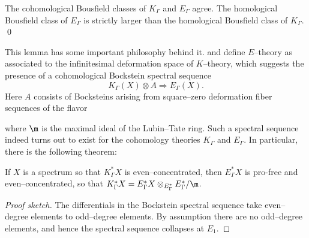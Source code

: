 \begin{lemma}\label{BadBousfieldClasses}
The cohomological Bousfield classes of $K_\Gamma$ and $E_\Gamma$ agree.  The homological Bousfield class of $E_\Gamma$ is strictly larger than the homological Bousfield class of $K_\Gamma$. \qed
\end{lemma}

\noindent This lemma has some important philosophy behind it.   and  define $E$--theory as associated to the infinitesimal deformation space of $K$--theory, which suggests the presence of a cohomological Bockstein spectral sequence \[K_\Gamma(X) \otimes A \Rightarrow E_\Gamma(X).\]  Here $A$ consists of Bocksteins arising from square--zero deformation fiber sequences of the flavor
\begin{center}
\end{center}
where $\m$ is the maximal ideal of the Lubin--Tate ring.  Such a spectral sequence indeed turns out to exist for the cohomology theories $K_\Gamma$ and $E_\Gamma$.  In particular, there is the following theorem:
\begin{theorem}\label{GoodCohomBousfieldClass}
If $X$ is a spectrum so that $K_\Gamma^* X$ is even--concentrated, then $E_\Gamma^* X$ is pro-free and even--concentrated, so that $K_\Gamma^* X = E_\Gamma^* X \otimes_{E_\Gamma^*} E_\Gamma^* / \m$.
\end{theorem}
\begin{proof}[Proof sketch]
The differentials in the Bockstein spectral sequence take even--degree elements to odd--degree elements. By assumption there are no odd--degree elements, and hence the spectral sequence collapses at $E_1$.
\end{proof}

